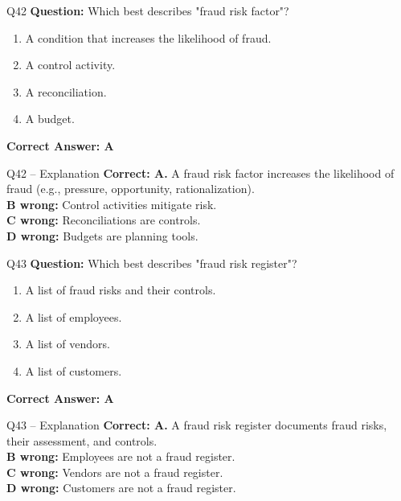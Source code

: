\documentclass[aspectratio=169,10pt]{beamer}
\begin{document}
	\begin{frame}[t]{Q42}
		\small
		\textbf{Question:} Which best describes "fraud risk factor"?
		\begin{enumerate}[label=\Alph*.,itemsep=1pt,topsep=2pt]
			\item A condition that increases the likelihood of fraud.
			\item A control activity.
			\item A reconciliation.
			\item A budget.
		\end{enumerate}
		\vspace{4pt}
		\textbf{Correct Answer: A}
	\end{frame}
	
	\begin{frame}[t]{Q42 -- Explanation}
		\small
		\textbf{Correct: A.} A fraud risk factor increases the likelihood of fraud (e.g., pressure, opportunity, rationalization). \\[4pt]
		\textbf{B wrong:} Control activities mitigate risk. \\[2pt]
		\textbf{C wrong:} Reconciliations are controls. \\[2pt]
		\textbf{D wrong:} Budgets are planning tools.
	\end{frame}
	
	\begin{frame}[t]{Q43}
		\small
		\textbf{Question:} Which best describes "fraud risk register"?
		\begin{enumerate}[label=\Alph*.,itemsep=1pt,topsep=2pt]
			\item A list of fraud risks and their controls.
			\item A list of employees.
			\item A list of vendors.
			\item A list of customers.
		\end{enumerate}
		\vspace{4pt}
		\textbf{Correct Answer: A}
	\end{frame}
	
	\begin{frame}[t]{Q43 -- Explanation}
		\small
		\textbf{Correct: A.} A fraud risk register documents fraud risks, their assessment, and controls. \\[4pt]
		\textbf{B wrong:} Employees are not a fraud register. \\[2pt]
		\textbf{C wrong:} Vendors are not a fraud register. \\[2pt]
		\textbf{D wrong:} Customers are not a fraud register.
	\end{frame}
	
\end{document}
